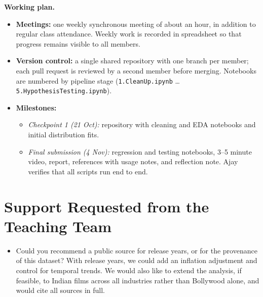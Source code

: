 \documentclass[11pt,a4paper]{article}
\begin{document}
\textbf{Working plan.}
\begin{itemize}
  \item \textbf{Meetings:} one weekly synchronous meeting of about an hour, in addition to regular class attendance. Weekly work is recorded in spreadsheet so that progress remains visible to all members.
  \item \textbf{Version control:} a single shared repository with one branch per member; each pull request is reviewed by a second member before merging. Notebooks are numbered by pipeline stage (\texttt{1.CleanUp.ipynb} \ldots{} \texttt{5.HypothesisTesting.ipynb}).
  \item \textbf{Milestones:}
  \begin{itemize}
    \item \emph{Checkpoint 1 (21 Oct):} repository with cleaning and EDA notebooks and initial distribution fits.
    \item \emph{Final submission (4 Nov):} regression and testing notebooks, 3--5 minute video, report, references with usage notes, and reflection note. Ajay verifies that all scripts run end to end.
  \end{itemize}
\end{itemize}

\section{Support Requested from the Teaching Team}
\begin{itemize}
  \item Could you recommend a public source for release years, or for the provenance of this dataset? With release years, we could add an inflation adjustment and control for temporal trends. We would also like to extend the analysis, if feasible, to Indian films across all industries rather than Bollywood alone, and would cite all sources in full.
\end{itemize}
\end{document}
